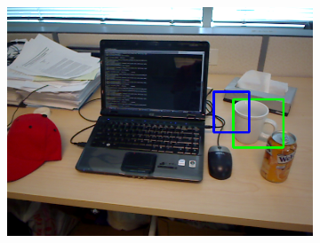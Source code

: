\begin{figure}
\begin{subfigure}[b]{0.3\textwidth}
		\includegraphics[width=\textwidth]{img/seguimiento_frame_template/frame_template-desk_1-coffee_mug_5-frame_28.png}
	\end{subfigure}



\end{figure}
